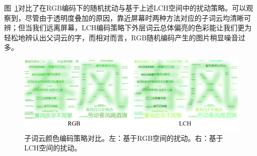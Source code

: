 图~\ref{fig:color_comparison}对比了在RGB编码下的随机扰动与基于上述LCH空间中的扰动策略。可以观察到，尽管由于透明度叠加的原因，靠近屏幕时两种方法对应的子词云均清晰可辨；但当我们远离屏幕，LCH编码策略下外层词云总体偏亮的色彩能让我们更为轻松地辨认出父词云的字，而相对而言，RGB随机编码产生的图片稍显噪音过多。
\vspace{-0.1cm}
\begin{figure}[htbp]
	\centering
	\includegraphics[width=\textwidth]{figures/color_comparison.png}
	\vspace{-0.5cm}
	\caption{子词云颜色编码策略对比。左：基于RGB空间的扰动。右：基于LCH空间的扰动。}
		\vspace{-0.5cm}
	\label{fig:color_comparison}
\end{figure}
